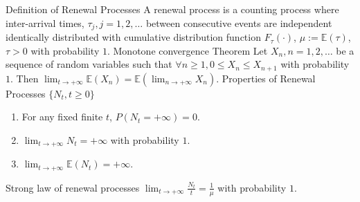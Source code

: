 \documentclass[11pt]{article}
\newenvironment{field}{}{\newpage}
\newif\ifnote
\newenvironment{note}{\notetrue}{\notefalse}
\begin{document}

\begin{note}
   \begin{field}
       Definition of Renewal Processes
   \end{field}
   \begin{field}
     A renewal process is a counting process where inter-arrival
     times, \(\tau_j, j = 1,2,\ldots\) between consecutive events are
     independent identically distributed with cumulative distribution
     function \(F_\tau(\cdot)\), \(\mu := \mathbb{E}(\tau)\),
     \(\tau > 0\) with probability \(1\).
   \end{field}
\end{note}
%
\begin{note}
  \begin{field}
    Monotone convergence Theorem
  \end{field}
  \begin{field}
    Let \(X_n, n = 1,2,\dots\) be a sequence of random variables such
    that \(\forall n \geq 1, 0 \leq X_n \leq X_{n+1}\) with
    probability \(1\). Then
    \(\lim_{t \to +\infty} \mathbb{E}(X_n) = \mathbb{E}(\lim_{n \to
      +\infty} X_n)\).
  \end{field}
\end{note}
%
\begin{note}
  \begin{field}
    Properties of Renewal Processes \(\{N_t, t \geq 0\}\)
  \end{field}
  \begin{field}
    \begin{enumerate}
    \item For any fixed finite \(t\), \(P(N_t = +\infty) = 0\).
    \item \(\lim_{t \to +\infty} N_t = +\infty\) with probability \(1\).
    \item \(\lim_{t \to +\infty} \mathbb{E}(N_t) = +\infty\).
    \end{enumerate}
  \end{field}
\end{note}
%
\begin{note}
  \begin{field}
    Strong law of renewal processes
  \end{field}
  \begin{field}
    \(\lim_{t \to +\infty} \frac{N_t}{t} = \frac{1}{\mu}\) with
    probability \(1\).
  \end{field}
\end{note}
\end{document}
